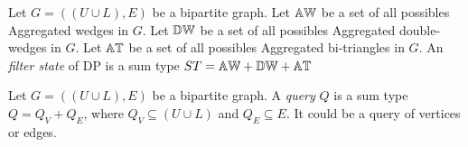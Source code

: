 %
%
\begin{definition}
Let $G=((U\cup L),E)$ be a bipartite graph. 
Let $\mathbb{AW}$ be a set of all possibles Aggregated wedges in $G$.
Let $\mathbb{DW}$ be a set of all possibles Aggregated double-wedges in $G$.
Let $\mathbb{AT}$ be a set of all possibles Aggregated bi-triangles in $G$.
An \textit{filter state} of DP is a sum type $ST = \mathbb{AW} + \mathbb{DW} + \mathbb{AT}$
\end{definition}
%
\begin{definition}[Query]
Let $G=((U\cup L),E)$ be a bipartite graph. 
A \textit{query} $Q$ is a sum type $Q = Q_V + Q_E$, where $Q_V \subseteq (U \cup L)$ and $Q_E \subseteq E$. 
It could be a query of vertices or edges.
\end{definition}
%

